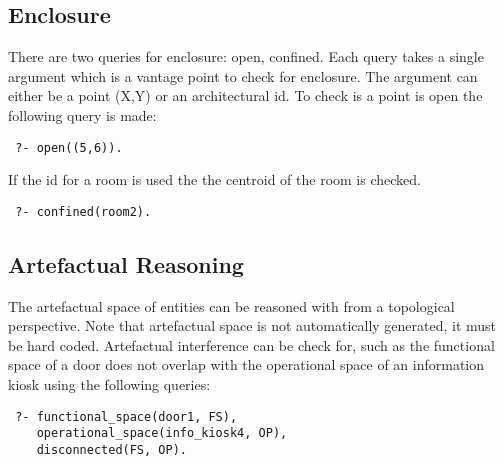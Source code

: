 \documentclass[12pt]{article}
\begin{document}
\subsection{Enclosure}
There are two queries for enclosure: open, confined. Each query takes a single argument which is a vantage point to check for enclosure. The argument can either be a point (X,Y) or an architectural id. To check is a point is open the following query is made:
\begin{verbatim}
 ?- open((5,6)).
\end{verbatim} If the id for a room is used the the centroid of the room is checked.
\begin{verbatim}
 ?- confined(room2).
\end{verbatim}

\subsection{Artefactual Reasoning}
The artefactual space of entities can be reasoned with from a topological perspective. Note that artefactual space is not automatically generated, it must be hard coded. Artefactual interference can be check for, such as the functional space of a door does not overlap with the operational space of an information kiosk using the following queries:
\begin{verbatim}
 ?- functional_space(door1, FS),
    operational_space(info_kiosk4, OP),
    disconnected(FS, OP).
\end{verbatim}



\end{document}
